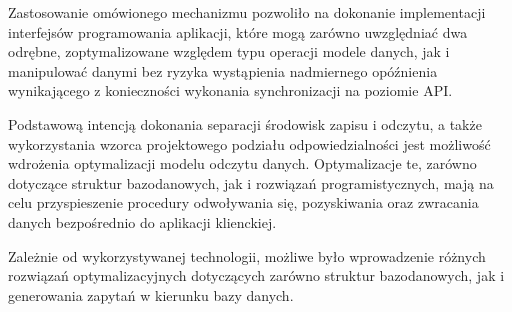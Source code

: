 Zastosowanie omówionego mechanizmu pozwoliło na dokonanie implementacji interfejsów programowania aplikacji, które mogą zarówno uwzględniać dwa odrębne, zoptymalizowane względem typu operacji modele danych, jak i manipulować danymi bez ryzyka wystąpienia nadmiernego opóźnienia wynikającego z konieczności wykonania synchronizacji na poziomie API.   

Podstawową intencją dokonania separacji środowisk zapisu i odczytu, a także wykorzystania wzorca projektowego podziału odpowiedzialności jest możliwość wdrożenia optymalizacji modelu odczytu danych. Optymalizacje te, zarówno dotyczące struktur bazodanowych, jak i rozwiązań programistycznych, mają na celu przyspieszenie procedury odwoływania się, pozyskiwania oraz zwracania danych bezpośrednio do aplikacji klienckiej.  

Zależnie od wykorzystywanej technologii, możliwe było wprowadzenie różnych rozwiązań optymalizacyjnych dotyczących zarówno struktur bazodanowych, jak i generowania zapytań w kierunku bazy danych.

